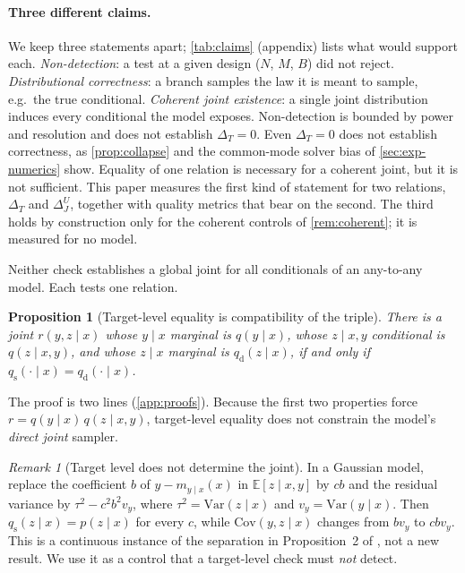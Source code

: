 \documentclass{article}
\theoremstyle{plain}
\newtheorem{proposition}[theorem]{Proposition}
\theoremstyle{definition}
\theoremstyle{remark}
\newtheorem{remark}[theorem]{Remark}
\newcommand{\E}{\mathbb{E}}
\newcommand{\qd}{q_{\mathrm{d}}}
\newcommand{\qs}{q_{\mathrm{s}}}
\begin{document}
\paragraph{Three different claims.}
We keep three statements apart; \cref{tab:claims} (appendix) lists what would support each.
\emph{Non-detection}: a test at a given design ($N$, $M$, $B$) did not reject.
\emph{Distributional correctness}: a branch samples the law it is meant to sample, e.g.\ the true conditional.
\emph{Coherent joint existence}: a single joint distribution induces every conditional the model exposes.
Non-detection is bounded by power and resolution and does not establish $\Delta_T=0$. Even $\Delta_T=0$ does not establish correctness, as \cref{prop:collapse} and the common-mode solver bias of \cref{sec:exp-numerics} show. Equality of one relation is necessary for a coherent joint, but it is not sufficient.
This paper measures the first kind of statement for two relations, $\Delta_T$ and $\Delta_J^U$, together with quality metrics that bear on the second. The third holds by construction only for the coherent controls of \cref{rem:coherent}; it is measured for no model.



Neither check establishes a global joint for all conditionals of an any-to-any model. Each tests one relation.

\begin{proposition}[Target-level equality is compatibility of the triple]
\label{prop:triple}
There is a joint $r(y,z\mid x)$ whose $y\mid x$ marginal is $q(y\mid x)$, whose $z\mid x,y$ conditional is $q(z\mid x,y)$, and whose $z\mid x$ marginal is $\qd(z\mid x)$, if and only if $\qs(\cdot\mid x)=\qd(\cdot\mid x)$.
\end{proposition}

The proof is two lines (\cref{app:proofs}).
Because the first two properties force $r=q(y\mid x)\,q(z\mid x,y)$, target-level equality does not constrain the model's \emph{direct joint} sampler.

\begin{remark}[Target level does not determine the joint]
\label{rem:joint}
In a Gaussian model, replace the coefficient $b$ of $y-m_{y\mid x}(x)$ in $\E[z\mid x,y]$ by $cb$ and the residual variance by $\tau^2-c^2b^2v_y$, where $\tau^2=\mathrm{Var}(z\mid x)$ and $v_y=\mathrm{Var}(y\mid x)$.
Then $\qs(z\mid x)=p(z\mid x)$ for every $c$, while $\mathrm{Cov}(y,z\mid x)$ changes from $bv_y$ to $cbv_y$.
This is a continuous instance of the separation in Proposition~2 of \citet{klotergens2026tabular}, not a new result. We use it as a control that a target-level check must \emph{not} detect.
\end{remark}
\end{document}
